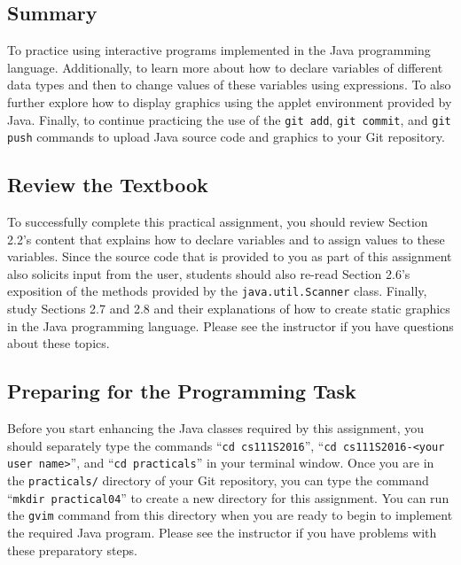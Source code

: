 


\vspace*{-.1in}
\subsection*{Summary}

To practice using interactive programs implemented in the Java programming language. Additionally, to learn more about
how to declare variables of different data types and then to change values of these variables using expressions.  To
also further explore how to display graphics using the applet environment provided by Java. Finally, to continue
practicing the use of the {\tt git add}, {\tt git commit}, and {\tt git push} commands to upload Java source code and
graphics to your Git repository.

\vspace*{-.1in}
\subsection*{Review the Textbook}

To successfully complete this practical assignment, you should review Section 2.2's content that explains how to declare
variables and to assign values to these variables. Since the source code that is provided to you as part of this
assignment also solicits input from the user, students should also re-read Section 2.6's exposition of the methods
provided by the {\tt java.util.Scanner} class. Finally, study Sections 2.7 and 2.8 and their explanations of how to
create static graphics in the Java programming language.  Please see the instructor if you have questions about
these topics.

\vspace*{-.1in}
\subsection*{Preparing for the Programming Task}

Before you start enhancing the Java classes required by this assignment, you should separately type the commands ``{\tt cd
  cs111S2016}'', ``{\tt cd cs111S2016-<your user name>}'', and ``{\tt cd practicals}'' in your terminal window. Once you
are in the {\tt practicals/} directory of your Git repository, you can type the command ``{\tt mkdir practical04}'' to
create a new directory for this assignment. You can run the {\tt gvim} command from this directory when you are ready to
begin to implement the required Java program. Please see the instructor if you have problems with these preparatory steps.

